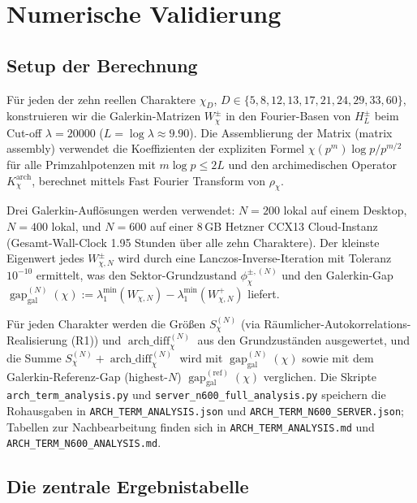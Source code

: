 \documentclass[10pt,twocolumn]{article}
\theoremstyle{definition}
\theoremstyle{remark}
\newcommand{\gap}{\operatorname{gap}}
\newcommand{\chifn}{\chi}
\newcommand{\archdiff}{\operatorname{arch\_diff}}
\begin{document}
\section{Numerische Validierung}
\label{sec:validation}

\subsection{Setup der Berechnung}
\label{sec:validation-setup}

Für jeden der zehn reellen Charaktere $\chifn_D$,
$D\in\{5,8,12,13,17,21,24,29,33,60\}$, konstruieren wir die Galerkin-Matrizen
$W^\pm_{\chifn}$ in den Fourier-Basen von $H_L^\pm$ beim Cut-off
$\lambda=20000$ ($L=\log\lambda\approx 9.90$). Die Assemblierung der Matrix (matrix assembly) verwendet die
Koeffizienten der expliziten Formel $\chifn(p^m)\log p/p^{m/2}$ für alle
Primzahlpotenzen mit $m\log p\leq 2L$ und den archimedischen Operator
$K^{\mathrm{arch}}_{\chifn}$, berechnet mittels Fast Fourier Transform von
$\rho_{\chifn}$.

Drei Galerkin-Auflösungen werden verwendet: $N=200$ lokal auf einem Desktop,
$N=400$ lokal, und $N=600$ auf einer 8\,GB Hetzner CCX13 Cloud-Instanz
(Gesamt-Wall-Clock 1.95 Stunden über alle zehn Charaktere). Der
kleinste Eigenwert jedes $W^\pm_{\chifn,N}$ wird durch eine
Lanczos-Inverse-Iteration mit Toleranz $10^{-10}$ ermittelt, was den
Sektor-Grundzustand $\phi^{\pm,(N)}_{\chifn}$ und den Galerkin-Gap
$\gap_{\mathrm{gal}}^{(N)}(\chifn)
:=\lambda_1^{\min}(W^-_{\chifn,N})-\lambda_1^{\min}(W^+_{\chifn,N})$ liefert.

Für jeden Charakter werden die Größen $S_{\chifn}^{(N)}$ (via
Räumlicher-Autokorrelations-Realisierung (R1)) und
$\archdiff_{\chifn}^{(N)}$ aus den Grundzuständen ausgewertet, und
die Summe $S_{\chifn}^{(N)}+\archdiff_{\chifn}^{(N)}$ wird mit
$\gap_{\mathrm{gal}}^{(N)}(\chifn)$ sowie mit dem Galerkin-Referenz-Gap (highest-$N$)
$\gap_{\mathrm{gal}}^{(\mathrm{ref})}(\chifn)$ verglichen. Die Skripte
\texttt{arch\_term\_analysis.py} und
\texttt{server\_n600\_full\_analysis.py} speichern die Rohausgaben in
\texttt{ARCH\_TERM\_ANALYSIS.json} und
\texttt{ARCH\_TERM\_N600\_SERVER.json}; Tabellen zur Nachbearbeitung
finden sich in \texttt{ARCH\_TERM\_ANALYSIS.md} und
\texttt{ARCH\_TERM\_N600\_ANALYSIS.md}.

\subsection{Die zentrale Ergebnistabelle}
\label{sec:validation-table}
\end{document}
